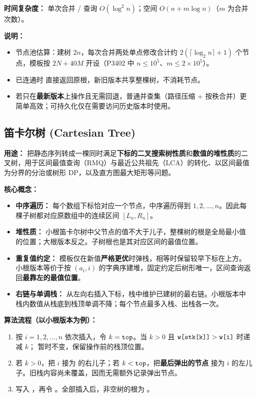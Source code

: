 \textbf{时间复杂度：} 单次合并 / 查询 $O(\log^2 n)$；空间 $O(n + m\log n)$（$m$ 为合并次数）。



\textbf{说明：}
\begin{itemize}
  \item 节点池估算：建树 $2n$，每次合并两处单点修改合计约 $2(\lceil \log_2 n \rceil + 1)$ 个节点，模板按 $2N + 40M$ 开设（P3402 中 $n \le 10^5$、$m \le 2 \times 10^5$）。
  \item 已连通时  直接返回原根，新旧版本共享整棵树，不消耗节点。
  \item 若只在\textbf{最新版本}上操作且无需回退，普通并查集（路径压缩 + 按秩合并）更简单高效；可持久化仅在需要访问历史版本时使用。
\end{itemize}

\subsection{笛卡尔树 (Cartesian Tree)}

\textbf{用途：}
把静态序列转成一棵同时满足\textbf{下标的二叉搜索树性质}和\textbf{数值的堆性质}的二叉树，用于区间最值查询（RMQ）与最近公共祖先（LCA）的转化、以区间最值为分界的分治或树形 DP，以及直方图最大矩形等问题。

\textbf{核心概念：}
\begin{itemize}
  \item \textbf{中序遍历：} 每个数组下标恰对应一个节点，中序遍历得到 $1,2,\ldots,n$。因此每棵子树都对应原数组中的连续区间 $[L_u,R_u]$。
  \item \textbf{堆性质：} 小根笛卡尔树中父节点的值不大于儿子，整棵树的根是全局最小值的位置；大根版本反之。子树根也是其对应区间的最值位置。
  \item \textbf{重复值约定：} 模板仅在新值\textbf{严格更优}时弹栈，相等时保留较早下标在上方。小根版本等价于按 $(a_i,i)$ 的字典序建堆，固定约定后树形唯一，区间查询返回\textbf{最靠左的最值位置}。
  \item \textbf{右链与单调栈：} 从左向右插入下标，栈中维护已建树的最右链。小根版本中栈内数值从栈底到栈顶单调不降；每个节点最多入栈、出栈各一次。
\end{itemize}

\textbf{算法流程（以小根版本为例）：}
\begin{enumerate}
  \item 按 $i=1,2,\ldots,n$ 依次插入，令 $k=\texttt{top}$。当 $k>0$ 且 $\texttt{w[stk[k]]}>\texttt{w[i]}$ 时递减 $k$； 暂时不变，保留操作前的栈顶位置。
  \item 若 $k>0$，把 $i$ 接为  的右儿子；若 $k<\texttt{top}$，把\textbf{最后弹出的节点}  接为 $i$ 的左儿子。旧栈内容尚未覆盖，因而无需额外记录弹出节点。
  \item 写入 ，再令 。全部插入后，非空树的根为 。
\end{enumerate}


